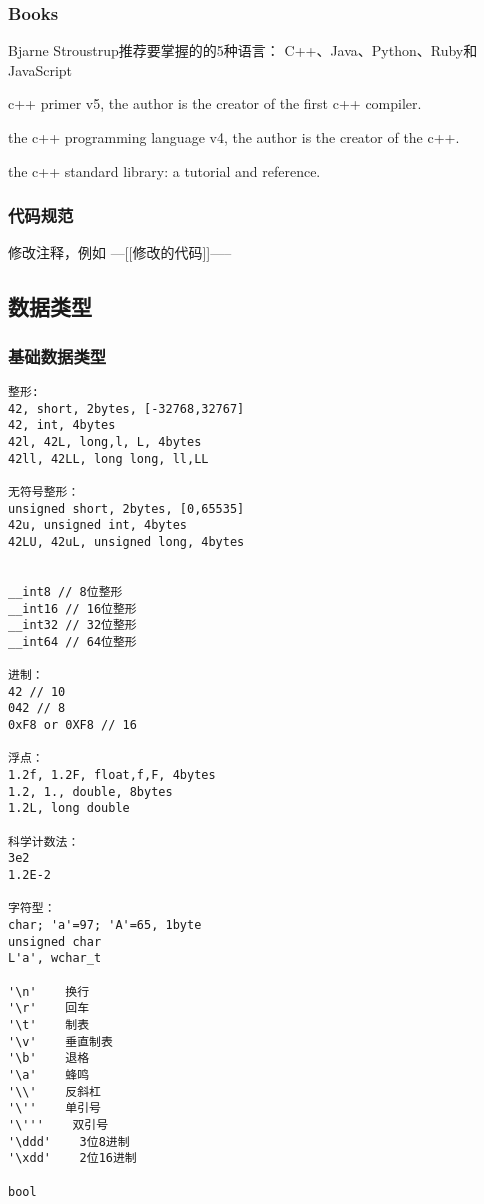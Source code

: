 \documentclass[UTF8]{../computerUniverse}
\begin{document}
\subsubsection{Books}


Bjarne Stroustrup推荐要掌握的的5种语言：
C++、Java、Python、Ruby和JavaScript


c++ primer v5, the author is the creator of the first c++ compiler.

the c++ programming language v4, the author is the creator of the c++.

the c++ standard library: a tutorial and reference.



\subsubsection{代码规范}

修改注释，例如
---[[修改的代码]]-----



\subsection{数据类型}

\subsubsection{基础数据类型}

\begin{lstlisting}
整形: 
42, short, 2bytes, [-32768,32767]
42, int, 4bytes
42l, 42L, long,l, L, 4bytes
42ll, 42LL, long long, ll,LL

无符号整形：
unsigned short, 2bytes, [0,65535]
42u, unsigned int, 4bytes
42LU, 42uL, unsigned long, 4bytes


__int8 // 8位整形
__int16 // 16位整形
__int32 // 32位整形
__int64 // 64位整形

进制： 
42 // 10
042 // 8
0xF8 or 0XF8 // 16

浮点：
1.2f, 1.2F, float,f,F, 4bytes
1.2, 1., double, 8bytes
1.2L, long double

科学计数法：
3e2
1.2E-2

字符型：
char; 'a'=97; 'A'=65, 1byte
unsigned char
L'a', wchar_t

'\n'    换行
'\r'    回车
'\t'    制表
'\v'    垂直制表
'\b'    退格
'\a'    蜂鸣
'\\'    反斜杠
'\''    单引号
'\'''    双引号
'\ddd'    3位8进制
'\xdd'    2位16进制

bool

\end{lstlisting}
\end{document}
